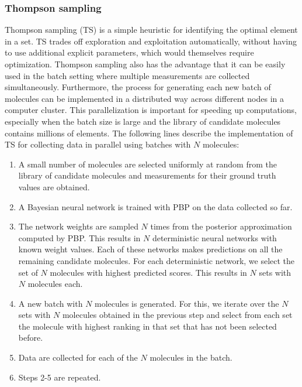 \subsubsection{Thompson sampling}

Thompson sampling (TS) \cite{Thompson_1933} is a simple heuristic for identifying the optimal element in a set. TS trades off exploration and exploitation automatically, without having to use additional explicit parameters, which would themselves require optimization.  Thompson sampling also has the advantage that it can be easily used in the batch setting where multiple measurements are collected simultaneously. Furthermore, the process for generating each new batch of molecules can be implemented in a distributed way across different nodes in a computer cluster. This parallelization is important for speeding up computations, especially when the batch size is large and the library of candidate molecules contains millions of elements. The following lines describe the implementation of TS for collecting data in parallel using batches with $N$ molecules:
\begin{enumerate}
\item A small number of molecules are selected uniformly at random from the library of candidate molecules and measurements for their ground truth values are obtained.
\item A Bayesian neural network is trained with PBP on the data collected so far.
\item The network weights are sampled $N$ times from the posterior approximation computed by PBP. This results in $N$ deterministic neural networks with known weight values. Each of these networks makes predictions on all the remaining candidate molecules. For each deterministic network, we select the set of $N$ molecules with highest predicted scores. This results in $N$ sets with $N$ molecules each.
\item A new batch with $N$ molecules is generated. For this, we iterate over the $N$ sets with $N$ molecules obtained in the previous step and select from each set the molecule with highest ranking in that set that has not been selected before.
\item Data are collected for each of the $N$ molecules in the batch.
\item Steps 2-5 are repeated.
\end{enumerate}


